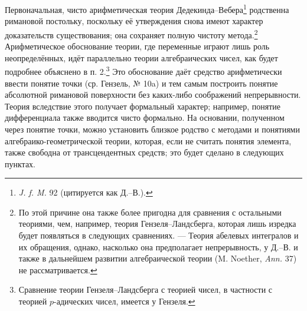 \documentclass[11pt]{article}
\begin{document}
Первоначальная, чисто арифметическая теория Дедекинда--Вебера\footnote{\emph{J. f. M.} 92 (цитируется как Д.--В.).} родственна римановой постольку, поскольку её утверждения снова имеют характер доказательств существования; она сохраняет полную чистоту метода.\footnote{По этой причине она также более пригодна для сравнения с остальными теориями, чем, например, теория Гензеля--Ландсберга, которая лишь изредка будет появляться в следующих сравнениях. --- Теория абелевых интегралов и их обращения, однако, насколько она предполагает непрерывность, у Д.--В. и также в дальнейшем развитии алгебраической теории (M. Noether, \emph{Ann.} 37) не рассматривается.} Арифметическое обоснование теории, где переменные играют лишь роль неопределённых, идёт параллельно теории алгебраических чисел, как будет подробнее объяснено в п. 2.\footnote{Сравнение теории Гензеля--Ландсберга с теорией чисел, в частности с теорией \(p\)-адических чисел, имеется у Гензеля.} Это обоснование даёт средство арифметически ввести понятие точки (ср. Гензель, № 10a) и тем самым построить понятие абсолютной римановой поверхности без каких-либо соображений непрерывности. Теория вследствие этого получает формальный характер; например, понятие дифференциала также вводится чисто формально. На основании, полученном через понятие точки, можно установить близкое родство с методами и понятиями алгебраико-геометрической теории, которая, если не считать понятия элемента, также свободна от трансцендентных средств; это будет сделано в следующих пунктах.
\end{document}
